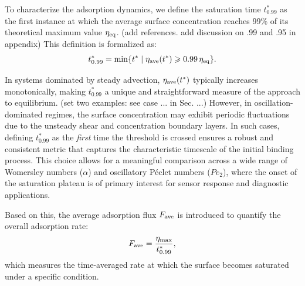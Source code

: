 \documentclass[lineno]{JFM-FLM_Au}
\DeclareMathOperator\arctanh{arctanh}
\begin{document}
{To characterize the adsorption dynamics, we define the saturation time $t_{0.99}^*$ as the first instance at which the average surface concentration reaches 99\% of its theoretical maximum value $\eta_{\rm eq}$. {\color{magenta}(add references. add discussion on .99 and .95 in appendix)} This definition is formalized as:
\begin{equation}
t_{0.99}^* = \min \{ t^* \mid \eta_{\rm ave}(t^*) \geq 0.99\, \eta_{\rm eq} \}.
\label{eq:saturation_time}
\end{equation}

In systems dominated by steady advection, $\eta_{\rm ave}(t^*)$ typically increases monotonically, making $t_{0.99}^*$ a unique and straightforward measure of the approach to equilibrium. {\color{magenta}(set two examples: see case ... in Sec. ...)} However, in oscillation-dominated regimes, the surface concentration may exhibit periodic fluctuations due to the unsteady shear and concentration boundary layers. In such cases, defining $t_{0.99}^*$ as the \textit{first} time the threshold is crossed ensures a robust and consistent metric that captures the characteristic timescale of the initial binding process. This choice allows for a meaningful comparison across a wide range of Womersley numbers ($\alpha$) and oscillatory P\'{e}clet numbers ($Pe_2$), where the onset of the saturation plateau is of primary interest for sensor response and diagnostic applications.

Based on this, the average adsorption flux $F_{\rm ave}$ is introduced to quantify the overall adsorption rate:
\begin{equation}
F_{\rm ave} = \frac{\eta_{\max}}{t_{0.99}^*},
\label{eq:Fave}
\end{equation}
which measures the time-averaged rate at which the surface becomes saturated under a specific condition.
}





\end{document}
